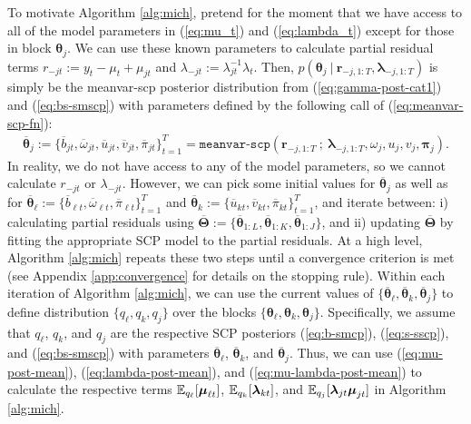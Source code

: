 To motivate Algorithm \ref{alg:mich}, pretend for the moment that we have access to all of the model parameters in (\ref{eq:mu_t}) and (\ref{eq:lambda_t}) except for those in block $\boldsymbol{\theta}_j$. We can use these known parameters to calculate partial residual terms $r_{-j t} := y_t - \mu_t + \mu_{j t}$ and $\lambda_{-jt} := \lambda_{jt}^{-1}\lambda_t$. Then, $p(\boldsymbol{\theta}_j\:|\:\mathbf{r}_{-j,1:T}, \boldsymbol{\lambda}_{-j,1:T})$ is simply be the meanvar-scp posterior distribution from (\ref{eq:gamma-post-cat1}) and (\ref{eq:bs-smscp}) with parameters defined by the following call of (\ref{eq:meanvar-scp-fn}):
\begin{align}
    \overline{\boldsymbol{\theta}}_j := \{\overline{b}_{jt}, \overline{\omega}_{jt}, \overline{u}_{jt}, \overline{v}_{jt}, \overline{\pi}_{jt}\}_{t=1}^T = \texttt{meanvar-scp}(\mathbf{r}_{-j,1:T}\:;\: \boldsymbol{\lambda}_{-j,1:T}, \omega_j, u_j, v_j, \boldsymbol{\pi}_{j}).
\end{align}
In reality, we do not have access to any of the model parameters, so we cannot calculate $r_{-j t}$ or $\lambda_{-jt}$. However, we can pick some initial values for $\overline{\boldsymbol{\theta}}_j$ as well as for $\overline{\boldsymbol{\theta}}_\ell := \{\overline{b}_{\ell t}, \overline{\omega}_{\ell t}, \overline{\pi}_{\ell t}\}_{t=1}^T$ and $\overline{\boldsymbol{\theta}}_k := \{ \overline{u}_{kt}, \overline{v}_{kt}, \overline{\pi}_{kt}\}_{t=1}^T$, and iterate between: i) calculating partial residuals using $\overline{\boldsymbol{\Theta}} := \{\overline{\boldsymbol{\theta}}_{1:L}, \overline{\boldsymbol{\theta}}_{1:K},\overline{\boldsymbol{\theta}}_{1:J}\}$, and ii) updating $\overline{\boldsymbol{\Theta}}$ by fitting the appropriate SCP model to the partial residuals. At a high level, Algorithm \ref{alg:mich} repeats these two steps until a convergence criterion is met (see Appendix \ref{app:convergence} for details on the stopping rule). Within each iteration of Algorithm \ref{alg:mich}, we can use the current values of $\{\overline{\boldsymbol{\theta}}_{\ell}, \overline{\boldsymbol{\theta}}_{k}, \overline{\boldsymbol{\theta}}_{j}\}$ to define distribution $\{q_\ell, q_k, q_j\}$ over the blocks $\{\boldsymbol{\theta}_\ell, \boldsymbol{\theta}_k, \boldsymbol{\theta}_j\}$. Specifically, we assume that $q_\ell$, $q_k$, and $q_j$ are the respective SCP posteriors (\ref{eq:b-smcp}), (\ref{eq:s-sscp}), and (\ref{eq:bs-smscp}) with parameters $\overline{\boldsymbol{\theta}}_{\ell}$, $\overline{\boldsymbol{\theta}}_{k}$, and $\overline{\boldsymbol{\theta}}_{j}$. Thus, we can use (\ref{eq:mu-post-mean}), (\ref{eq:lambda-post-mean}), and (\ref{eq:mu-lambda-post-mean}) to calculate the respective terms $\mathbb{E}_{q_\ell}[\boldsymbol{\mu}_{\ell t}]$, $\mathbb{E}_{q_k}[\boldsymbol{\lambda}_{k t}]$, and $\mathbb{E}_{q_j}[\boldsymbol{\lambda}_{j t}\boldsymbol{\mu}_{j t}]$ in Algorithm \ref{alg:mich}.

